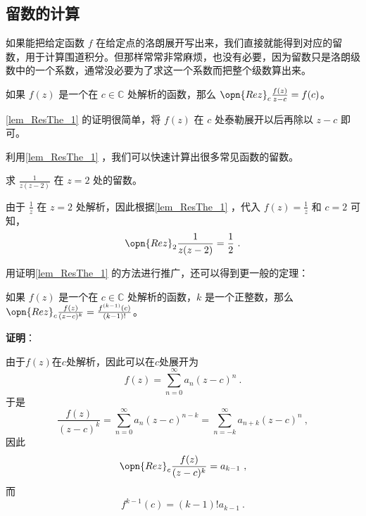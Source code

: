 \subsection{留数的计算}



如果能把给定函数 $f$ 在给定点的洛朗展开写出来，我们直接就能得到对应的留数，用于计算围道积分。但那样常常非常麻烦，也没有必要，因为留数只是洛朗级数中的一个系数，通常没必要为了求这一个系数而把整个级数算出来。

\begin{lemma}{}\label{lem_ResThe_1}
如果 $f(z)$ 是一个在 $c\in\mathbb{C}$ 处解析的函数，那么 $\opn{Rez}_c\frac{f(z)}{z-c}=f(c)$。
\end{lemma}

\autoref{lem_ResThe_1} 的证明很简单，将 $f(z)$ 在 $c$ 处泰勒展开以后再除以 $z-c$ 即可。

利用\autoref{lem_ResThe_1} ，我们可以快速计算出很多常见函数的留数。

\begin{example}{}
求 $\frac{1}{z(z-2)}$ 在 $z=2$ 处的留数。

由于 $\frac{1}{z}$ 在 $z=2$ 处解析，因此根据\autoref{lem_ResThe_1} ，代入 $f(z)=\frac{1}{z}$ 和 $c=2$ 可知，
\begin{equation}
\opn{Rez}_2\frac{1}{z(z-2)}=\frac{1}{2}~.
\end{equation}
\end{example}

用证明\autoref{lem_ResThe_1} 的方法进行推广，还可以得到更一般的定理：

\begin{theorem}{}\label{the_ResThe_2}
如果 $f(z)$ 是一个在 $c\in\mathbb{C}$ 处解析的函数，$k$ 是一个正整数，那么 $\opn{Rez}_c\frac{f(z)}{(z-c)^k}=\frac{f^{(k-1)}(c)}{(k-1)!}$。
\end{theorem}

\textbf{证明}：

由于$f(z)$在$c$处解析，因此可以在$c$处展开为
\begin{equation}
f(z) = \sum_{n=0}^\infty a_n(z-c)^n~.
\end{equation}
于是
\begin{equation}
\frac{f(z)}{(z-c)^k} = \sum_{n=0}^\infty a_n(z-c)^{n-k} = \sum_{n=-k}^\infty a_{n+k}(z-c)^n~,
\end{equation}
因此
\begin{equation}
\opn{Rez}_c\frac{f(z)}{(z-c)^k} = a_{k-1}~,
\end{equation}
而
\begin{equation}
f^{k-1}(c)=(k-1)!a_{k-1}~.
\end{equation}

